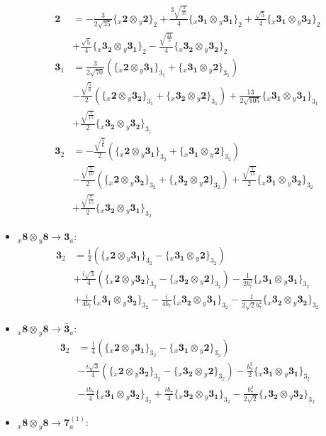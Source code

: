\documentclass[english]{article}
\newcommand{\rep}[1]{\mathbf{#1}}
\newcommand{\repx}[2]{{}_{#2}\mathbf{#1}}
\newcommand{\subcg}[3]{\big\{ \repx{#1}{x}\otimes\repx{#2}{y}\big\}^{}_{#3}}
\begin{document}
\begin{itemize}
\begin{align*}
\rep{2} & = -\frac{3}{2 \sqrt{35}}\subcg{2}{2}{2}+\frac{3 \sqrt{\frac{3}{35}}}{4}\subcg{3_{1}}{3_{1}}{2}+\frac{\sqrt{5}}{4}\subcg{3_{1}}{3_{2}}{2} \\ 
 & +\frac{\sqrt{5}}{4}\subcg{3_{2}}{3_{1}}{2}-\frac{\sqrt{\frac{21}{5}}}{4}\subcg{3_{2}}{3_{2}}{2}
\\
\rep{3}_{1} & = \frac{3}{2 \sqrt{70}}\left(\subcg{2}{3_{1}}{3_{1}}+\subcg{3_{1}}{2}{3_{1}}\right) \\ 
 & -\frac{\sqrt{\frac{5}{6}}}{2}\left(\subcg{2}{3_{2}}{3_{1}}+\subcg{3_{2}}{2}{3_{1}}\right)+\frac{13}{2 \sqrt{105}}\subcg{3_{1}}{3_{1}}{3_{1}} \\ 
 & +\frac{\sqrt{\frac{7}{15}}}{2}\subcg{3_{2}}{3_{2}}{3_{1}}
\\
\rep{3}_{2} & = -\frac{\sqrt{\frac{5}{6}}}{2}\left(\subcg{2}{3_{1}}{3_{2}}+\subcg{3_{1}}{2}{3_{2}}\right) \\ 
 & -\frac{\sqrt{\frac{7}{10}}}{2}\left(\subcg{2}{3_{2}}{3_{2}}+\subcg{3_{2}}{2}{3_{2}}\right)+\frac{\sqrt{\frac{7}{15}}}{2}\subcg{3_{1}}{3_{2}}{3_{2}} \\ 
 & +\frac{\sqrt{\frac{7}{15}}}{2}\subcg{3_{2}}{3_{1}}{3_{2}}
\end{align*}
\item $\repx{8}{x}\otimes\repx{8}{y}\to\rep{3}_{a}$:
\begin{align*}
\rep{3}_{2} & = \frac{1}{4}\left(\subcg{2}{3_{1}}{3_{2}}-\subcg{3_{1}}{2}{3_{2}}\right) \\ 
 & +\frac{i \sqrt{3}}{4}\left(\subcg{2}{3_{2}}{3_{2}}-\subcg{3_{2}}{2}{3_{2}}\right)-\frac{1}{2 b_7^3}\subcg{3_{1}}{3_{1}}{3_{2}} \\ 
 & +\frac{i}{4 b_7}\subcg{3_{1}}{3_{2}}{3_{2}}-\frac{i}{4 b_7}\subcg{3_{2}}{3_{1}}{3_{2}}-\frac{1}{2 \sqrt{2} b_7^2}\subcg{3_{2}}{3_{2}}{3_{2}}
\end{align*}
\item $\repx{8}{x}\otimes\repx{8}{y}\to\rep{\bar{3}}_{a}$:
\begin{align*}
\rep{3}_{2} & = \frac{1}{4}\left(\subcg{2}{3_{1}}{3_{2}}-\subcg{3_{1}}{2}{3_{2}}\right) \\ 
 & -\frac{i \sqrt{3}}{4}\left(\subcg{2}{3_{2}}{3_{2}}-\subcg{3_{2}}{2}{3_{2}}\right)-\frac{b_7^3}{2}\subcg{3_{1}}{3_{1}}{3_{2}} \\ 
 & -\frac{i b_7}{4}\subcg{3_{1}}{3_{2}}{3_{2}}+\frac{i b_7}{4}\subcg{3_{2}}{3_{1}}{3_{2}}-\frac{b_7^2}{2 \sqrt{2}}\subcg{3_{2}}{3_{2}}{3_{2}}
\end{align*}
\item $\repx{8}{x}\otimes\repx{8}{y}\to\rep{7}_{a}^{(1)}$:

\end{itemize}
\end{document}
